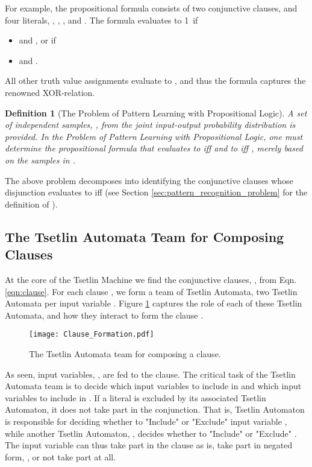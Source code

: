 \documentclass[11pt,a4paper]{article}
\newcommand{\True}{\mbox{1}}
\newtheorem{definition}{Definition}
\begin{document}
For example, the propositional formula  consists of two conjunctive clauses, and four literals, , , , and . The formula evaluates to \True\ if
\begin{itemize}
    \item  and , or if
    \item  and .
\end{itemize}
All other truth value assignments evaluate to , and thus the formula captures the renowned XOR-relation.
\begin{definition}[The Problem of Pattern Learning with Propositional Logic]\label{def:classification_problem}
A set  of independent samples, , from the joint input-output probability distribution  is provided. In the Problem of Pattern Learning with Propositional Logic, one must determine the propositional formula  that evaluates to  iff  and to  iff , merely based on the samples in . 
\end{definition}
The above problem decomposes into identifying the conjunctive clauses  whose disjunction evaluates to  iff  (see Section \ref{sec:pattern_recognition_problem} for the definition of ).

\subsection{The Tsetlin Automata Team for Composing Clauses}

At the core of the Tsetlin Machine we find the conjunctive clauses, , from Eqn. \ref{eqn:clause}. For each clause , we form a team of  Tsetlin Automata, two Tsetlin Automata per input variable . Figure \ref{figure:clause_formation} captures the role of each of these Tsetlin Automata, and how they interact to form the clause .

\begin{figure}[!th]
\centering
\texttt{[image: Clause\_Formation.pdf]}
\caption{The Tsetlin Automata team for composing a clause.}
\label{figure:clause_formation}
\end{figure}

As seen,  input variables, , are fed to the clause. The critical task of the Tsetlin Automata team is to decide which input variables to include in  and which input variables to include in . If a literal is excluded by its associated Tsetlin Automaton, it does not take part in the conjunction.  That is, Tsetlin Automaton  is responsible for deciding whether to "Include" or "Exclude" input variable , while another Tsetlin Automaton, , decides whether to "Include" or "Exclude" . The input variable  can thus take part in the clause  as is, take part in negated form, , or not take part at all.
\end{document}
